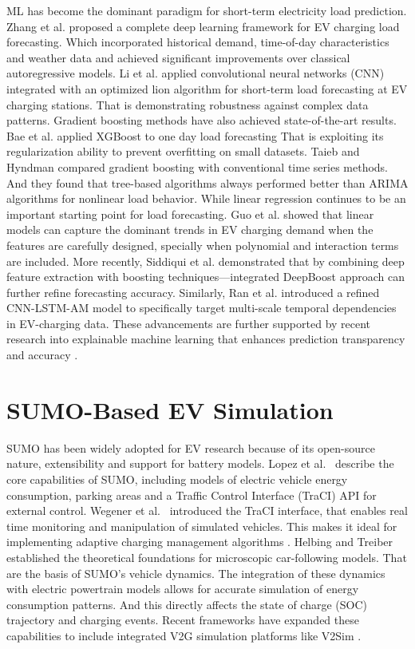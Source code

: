 \documentclass{thesis-library}
\begin{document}
ML has become the dominant paradigm for short-term electricity load prediction. Zhang et al. \cite{sustainability_xai_2025} proposed a complete deep learning framework for EV charging load forecasting. Which incorporated historical demand, time-of-day characteristics and weather data and achieved significant improvements over classical autoregressive models. Li et al. \cite{li2018shortterm} applied convolutional neural networks (CNN) integrated with an optimized lion algorithm for short-term load forecasting at EV charging stations. That is demonstrating robustness against complex data patterns. Gradient boosting methods have also achieved state-of-the-art results. Bae et al. \cite{bae2022xgboost} applied XGBoost to one day load forecasting That is exploiting its regularization ability to prevent overfitting on small datasets. Taieb and Hyndman \cite{decision_tree_load2019} compared gradient boosting with conventional time series methods. And they found that tree-based algorithms always performed better than ARIMA algorithms for nonlinear load behavior. While linear regression continues to be an important starting point for load forecasting. Guo et al. \cite{regression_ev2020} showed that linear models can capture the dominant trends in EV charging demand when the features are carefully designed, specially when polynomial and interaction terms are included. More recently, Siddiqui et al. \cite{siddiqui2025electric} demonstrated that by combining deep feature extraction with boosting techniques—integrated DeepBoost approach can further refine forecasting accuracy. Similarly, Ran et al. \cite{ran2025ev} introduced a refined CNN-LSTM-AM model to specifically target multi-scale temporal dependencies in EV-charging data. These advancements are further supported by recent research into explainable machine learning that enhances prediction transparency and accuracy \cite{sustainability_xai_2025}.

\section{SUMO-Based EV Simulation}

SUMO has been widely adopted for EV research because of its open-source nature, extensibility and support for battery models. 
Lopez et al.~\cite{sumo2018} describe the core capabilities of SUMO, including models of electric vehicle energy consumption, parking areas and a Traffic Control Interface (TraCI) API for external control.
Wegener et al.~\cite{traci2012} introduced the TraCI interface, that enables real time monitoring and manipulation of simulated vehicles.
This makes it ideal for implementing adaptive charging management algorithms .
Helbing and Treiber~\cite{ev_simulation2020} established the theoretical foundations for microscopic car-following models. That are the basis of SUMO's vehicle dynamics. The integration of these dynamics with electric powertrain models allows for accurate simulation of energy consumption patterns. And this directly affects the state of charge (SOC) trajectory and charging events. Recent frameworks have expanded these capabilities to include integrated V2G simulation platforms like V2Sim \cite{qian_v2sim_2024}.
\end{document}
